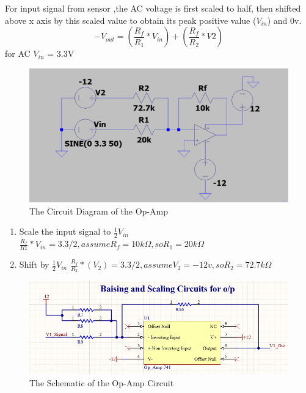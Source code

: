 \documentclass[12pt,a4paper]{book}
\begin{document}
For input signal from sensor ,the AC voltage is first scaled to half, then shifted above x axis by this scaled value to obtain its peak positive value (\(V_{in}\)) and 0v.
\begin{equation}
  -V_{out}=\left(\frac{R_{f}}{R_{1}}\ast V_{in}\right)+\left(\frac{R_{f}}{R_{2}}\ast V2\right)
  \label{equation:eq46}
\end{equation}
for AC \(V_{in}\) = 3.3V
\begin{figure}[h!]
  \centering
  \includegraphics[width = 15cm]{image37.png}
  \caption{The Circuit Diagram of the Op-Amp}
  \label{fig:image37}
\end{figure}
\begin{enumerate}
  \item Scale the input signal to \(\frac{1}{2}V_{in}\)
  \newline\(\frac{R_{f}}{R1}\ast V_{in}=3.3/2,   assume R_{f} =10k\Omega , so R_{1} =20k\Omega\)
  \item Shift by \(\frac{1}{2}V_{in}\)
  \newline\(\frac{R_{f}}{R_{2}}\ast(V_{2})=3.3/2  ,assume V_{2} =-12v , so R_{2} = 72.7k\Omega\)
\end{enumerate}
\begin{figure}[h!]
  \centering
  \includegraphics[width = 16cm]{image39.png}
  \caption{The Schematic of the Op-Amp Circuit}
  \label{fig:image39}
\end{figure}
\end{document}
